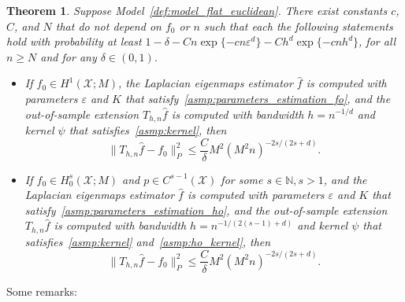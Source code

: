 \documentclass{article}
\newcommand{\1}{\mathbf{1}}
\newcommand{\mc}[1]{\mathcal{#1}}
\newcommand{\wh}[1]{\widehat{#1}}
\theoremstyle{alden}
\theoremstyle{aldenthm}
\newtheorem{theorem}{Theorem}
\theoremstyle{definition}
\theoremstyle{remark}
\begin{document}
\begin{theorem}
	\label{thm:laplacian_eigenmaps_estimation_out_of_sample}
	Suppose Model~\ref{def:model_flat_euclidean}. There exist constants $c$, $C$, and $N$ that do not depend on $f_0$ or $n$ such that each the following statements hold with probability at least $1 - \delta - Cn\exp\{-cn\varepsilon^d\} - Ch^d\exp\{-cnh^d\}$,  for all $n \geq N$ and for any $\delta \in (0,1)$.
	\begin{itemize}
		\item If $f_0 \in H^1(\mc{X};M)$, the Laplacian eigenmaps estimator $\wh{f}$ is computed with parameters $\varepsilon$ and $K$ that satisfy~\ref{asmp:parameters_estimation_fo}, and the out-of-sample extension $T_{h,n}\wh{f}$ is computed with bandwidth $h = n^{-1/d}$ and kernel $\psi$ that satisfies~\ref{asmp:kernel}, then
		\begin{equation*}
		\|T_{h,n}\wh{f} - f_0\|_P^2 \leq \frac{C}{\delta}M^2(M^2n)^{-2s/(2s + d)}.
		\end{equation*}
		\item If $f_0 \in H_0^s(\mc{X};M)$ and $p \in C^{s - 1}(\mc{X})$ for some $s \in \mathbb{N}, s > 1$, and the Laplacian eigenmaps estimator $\wh{f}$ is computed with parameters $\varepsilon$ and $K$ that satisfy~\ref{asmp:parameters_estimation_ho}, and the out-of-sample extension $T_{h,n}\wh{f}$ is computed with bandwidth $h = n^{-1/(2(s - 1) + d)}$ and kernel $\psi$ that satisfies~\ref{asmp:kernel} and~\ref{asmp:ho_kernel}, then
		\begin{equation*}
		\|T_{h,n}\wh{f} - f_0\|_P^2 \leq \frac{C}{\delta}M^2(M^2n)^{-2s/(2s + d)}.
		\end{equation*}
	\end{itemize}
\end{theorem}
Some remarks:
\end{document}
